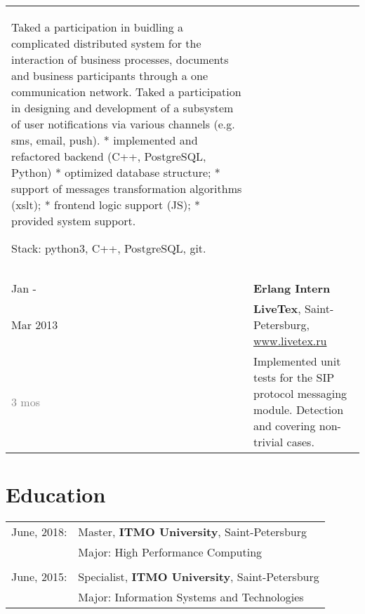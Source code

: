 \documentclass[a4paper,10pt]{article}
\begin{document}
\begin{tabularx}{\textwidth}{lX}
{                                    Taked a participation in buidling a complicated distributed system for the interaction of business processes, documents and business participants through a one communication network.\newline\newline
                                    Taked a participation in designing and development of a subsystem of user
                                    notifications via various channels (e.g. sms, email, push).\newline
                                    * implemented and refactored backend (C++, PostgreSQL, Python)\newline
                                    * optimized database structure;\newline
                                    * support of messages transformation algorithms (xslt);\newline
                                    * frontend logic support (JS);\newline
                                    * provided system support.\newline

                                    Stack: python3, C++, PostgreSQL, git.
                                } \\
    
\multicolumn{2}{c}{}\\\\

    Jan -                   &   \textbf{Erlang Intern} \\
    Mar 2013                &   \textbf{LiveTex}, Saint-Petersburg,
                                \href{www.livetex.ru}{www.livetex.ru} \\
    \textcolor{gray}
    {3 mos}
                            &   \footnotesize{

                                    Implemented unit tests for the SIP protocol messaging module. Detection and covering non-trivial cases.
                                }

\end{tabularx}


\section{Education}
\begin{tabular}{ll}
    June, 2018:     & Master, \textbf{ITMO University}, Saint-Petersburg \\
                    & Major:  High Performance Computing \\

    \multicolumn{2}{c}{}\\

    June, 2015:     & Specialist, \textbf{ITMO University}, Saint-Petersburg \\
                    & Major:  Information Systems and Technologies
\end{tabular}
\end{document}
